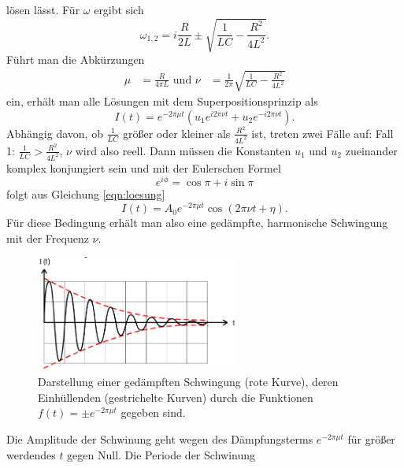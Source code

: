 lösen lässt. Für $\omega$ ergibt sich
\begin{equation}
  \omega_{1,2} = i \frac{R}{2L}\pm \sqrt{\frac{1}{L C} - \frac{R^2}{4L^2}}.
  \label{eqn:omega12}
\end{equation}
Führt man die Abkürzungen
\begin{align*}
  \mu &= \frac{R}{4 \pi L} \text{ und }
  \nu &= \frac{1}{2\pi} \sqrt{\frac{1}{L C} - \frac{R^2}{4 L^2}}
\end{align*}
ein, erhält man alle Lösungen mit dem Superpositionsprinzip als
\begin{equation}
  I(t) = e^{-2 \pi \mu t} (u_1 e^{i 2 \pi \nu t} + u_2 e^{-i 2 \pi \nu t}).
  \label{eqn:loesung}
\end{equation}
Abhängig davon, ob $\frac{1}{L C}$ größer oder kleiner als $\frac{R^2}{4L^2}$ ist,
treten zwei Fälle auf: \newline
Fall 1: $\frac{1}{L C} > \frac{R^2}{4L^2}$, $\nu$ wird also reell. Dann müssen
die Konstanten $u_1$ und $u_2$ zueinander komplex konjungiert sein und mit der
Eulerschen Formel
\begin{equation}
  e^{i\phi} = \cos{\pi} + i \sin{\pi}
  \label{eqn:euler}
\end{equation}
folgt aus Gleichung \eqref{eqn:loesung}
\begin{equation}
  I(t) = A_0 e^{-2\pi\mu t}\cos{(2\pi\nu t + \eta)}.
  \label{eqn:gedaempfte_schwingung}
\end{equation}
Für diese Bedingung erhält man also eine gedämpfte, harmonische Schwingung mit der
Frequenz $\nu$.
\begin{figure}
  \centering
  \includegraphics[width=0.6\textwidth]{gedaempfte_schwingung.png}
  \caption{Darstellung einer gedämpften Schwingung (rote Kurve), deren Einhüllenden
  (gestrichelte Kurven) durch die Funktionen $f(t)=\pm e^{-2\pi\mu t}$ gegeben
  sind\cite{sample}.}
  \label{fig:gedaempfte_schwingung}
\end{figure}
Die Amplitude der Schwinung geht wegen des Dämpfungsterms
$e^{-2\pi\mu t}$ für größer werdendes $t$ gegen Null. Die Periode der Schwinung
